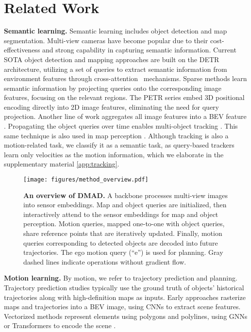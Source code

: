 \section{Related Work}
\label{sec:related_work}

\textbf{Semantic learning.} Semantic learning includes object detection and map segmentation. Multi-view cameras have become popular due to their cost-effectiveness and strong capability in capturing semantic information. Current SOTA object detection and mapping approaches are built on the DETR~\cite{carion2020end} architecture, utilizing a set of queries to extract semantic information from environment features through cross-attention~\cite{vaswani2017attention} mechanisms. Sparse methods \cite{wang2022detr3d, lin2022sparse4d} learn semantic information by projecting queries onto the corresponding image features, focusing on the relevant regions. The PETR series \cite{liu2022petr, liu2023petrv2, wang2023exploring} embed 3D positional encoding directly into 2D image features, eliminating the need for query projection. Another line of work aggregates all image features into a \gls{BEV} feature \cite{philion2020lift, li2022bevformer, yang2023bevformer, pan2024clip, liao2023maptr, maptrv2}. Propagating the object queries over time enables multi-object tracking \cite{zeng2022motr, meinhardt2022trackformer}. This same technique is also used in map perception \cite{chen2025maptracker}. Although tracking is also a motion-related task, we classify it as a semantic task, as query-based trackers learn only velocities as the motion information, which we elaborate in the supplementary material \cref{app:tracking}. \\


\begin{figure*}[t]
    \centering
    \texttt{[image: figures/method\_overview.pdf]}
    \caption{\textbf{An overview of DMAD.} A backbone processes multi-view images into sensor embeddings. Map and object queries are initialized, then interactively attend to the sensor embeddings for map and object perception. Motion queries, mapped one-to-one with object queries, share reference points that are iteratively updated. Finally, motion queries corresponding to detected objects are decoded into future trajectories. The ego motion query (``e'') is used for planning. Gray dashed lines indicate operations without gradient flow.}
    \label{fig:method_overview}
\end{figure*}

\textbf{Motion learning.} By motion, we refer to trajectory prediction and planning. Trajectory prediction studies typically use the ground truth of objects' historical trajectories along with high-definition maps as inputs. Early approaches \cite{chai2019multipath, cui2019multimodal, bansal2018chauffeurnet} rasterize maps and trajectories into a \gls{BEV} image, using CNNs to extract scene features. Vectorized methods \cite{gao2020vectornet, zhou2022hivt} represent elements using polygons and polylines, using GNNs or Transformers to encode the scene \cite{ngiam2021scene, wagner2024redmotion, shi2022motion, gu2021densetnt, zhang2024simpl}. 

